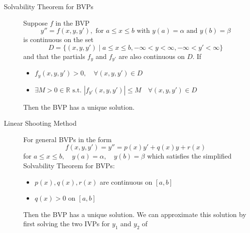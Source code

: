 \documentclass[8pt]{article}
\begin{document}

\begin{multicols}{2}
  \begin{description}
  \item[Solvability Theorem for BVPs] Suppose $f$ in the BVP
    $$y''=f(x,y,y'), \text{ for } a\leq x\leq b \text{ with } y(a)=\alpha \text{ and } y(b)=\beta$$
    is continuous on the set
    $$D=\{(x,y,y') \mid a\leq x\leq b, -\infty<y<\infty, -\infty<y'<\infty\}$$
    and that the partials $f_y$ and $f_{y'}$ are also continuous on $D$. If
      \begin{itemize}
      \item $f_y(x,y,y')>0, \quad\forall (x,y,y') \in D$
      \item $\exists M>0 \in \mathbb{R} \text{ s.t. } |f_{y'}(x,y,y')|\leq M \quad\forall(x,y,y')\in D$
      \end{itemize}
      Then the BVP has a unique solution.
    \item[Linear Shooting Method] For general BVPs in the form
    $$f(x,y,y') = y'' = p(x)y' + q(x)y + r(x)$$ for $a\leq x \leq b,\quad
    y(a) = \alpha,\quad y(b) = \beta$
    which satisfies the simplified Solvability Theorem for BVPs:
    \begin{itemize}
    \item $p(x), q(x), r(x)$ are continuous on $[a,b]$
    \item $q(x)>0$ on $[a,b]$
    \end{itemize}
    Then the BVP has a unique solution. We can approximate this
    solution by first solving the two IVPs for $y_1$ and $y_2$ of
    \begin{equation*}

\end{equation*}
\end{description}
\end{multicols}
\end{document}
